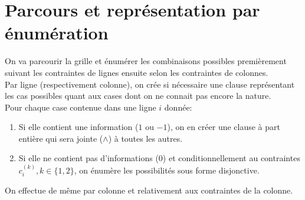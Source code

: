\documentclass[a4paper,12pt]{report}
\begin{document}
\section{Parcours et représentation par énumération}


On va parcourir la grille et énumérer les combinaisons possibles premièrement suivant les contraintes de lignes ensuite selon les contraintes de colonnes.\\ 

Par ligne (respectivement colonne), on crée si nécessaire une clause représentant les cas possibles quant aux cases dont on ne connait pas encore la nature.\\

Pour chaque case contenue dans une ligne $i$ donnée:
\begin{enumerate}
\item Si elle contient une information ($1$ ou $-1$), on en créer une clause à part entière qui sera jointe ($\wedge$) à toutes les autres.
\item Si elle ne contient pas d'informations ($0$) et conditionnellement au contraintes $c_i^{(k)}, k\in\{1,2\}$, on énumère les possibilités sous forme disjonctive.
\end{enumerate}
On effectue de même par colonne et relativement aux contraintes de la colonne.\\


%
\end{document}

